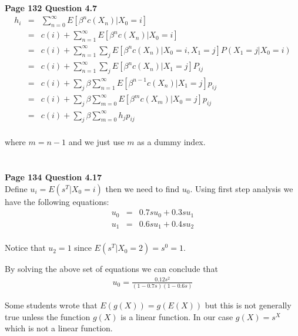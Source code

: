 \documentclass[10pt,a4paper]{article}
\begin{document}
\begin{flushleft}
\textbf{Page 132 Question 4.7}\\
 \begin{eqnarray*}
h_i &=& \sum_{n=0}^{\infty} E[\beta^n c(X_n) |X_0=i]\\
&=& c(i) + \sum_{n=1}^{\infty} E[\beta^n c(X_n) |X_0=i]\\
&=& c(i) + \sum_{n=1}^{\infty} \sum_j E[\beta^n c(X_n) |X_0=i, X_1=j] P(X_1=j|X_0=i)\\
&=& c(i) + \sum_{n=1}^{\infty} \sum_j E[\beta^n c(X_n) |X_1=j] P_{ij}\\
&=& c(i) + \sum_j  \beta \sum_{n=1}^{\infty}  E[\beta^{n-1} c(X_n) |X_1=j] p_{ij}\\
&=& c(i) + \sum_j  \beta \sum_{m=0}^{\infty}  E[\beta^{m} c(X_m) |X_0=j] p_{ij}\\
&=& c(i) + \sum_j  \beta \sum_{m=0}^{\infty}  h_j p_{ij}\\
 \end{eqnarray*}

where $m=n-1$ and we just use $m$ as a dummy index.



\begin{eqnarray*}
\\
\end{eqnarray*}

\textbf{Page 134 Question 4.17}\\
Define $u_i=E(s^T|X_0=i)$ then we need to find $u_0$. Using first
step analysis we have the following equations:
\begin{eqnarray*}
u_0 &=& 0.7 s u_0 + 0.3 s u_1\\
u_1 &=& 0.6 s u_1 + 0.4 s u_2\\
\end{eqnarray*}

Notice that $u_2=1$ since $E(s^T|X_0=2)=s^0=1$.

By solving the above set of equations we can conclude that
\begin{eqnarray*}
u_0 = \frac{0.12 s^2}{(1-0.7s)(1-0.6s)}
\end{eqnarray*}

Some students wrote that $E(g(X))=g(E(X))$ but this is not
generally true unless the function $g(X)$ is a linear function. In
our case $g(X)=s^X$ which is not a linear function.

\end{flushleft}
\end{document}
